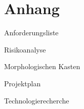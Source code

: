 \documentclass[main.tex]{subfiles} %
\begin{document}
\section{Anhang}


\newpage

Anforderungsliste

Risikoanalyse

Morphologischen Kasten

Projektplan

Technologierecherche
\end{document}
